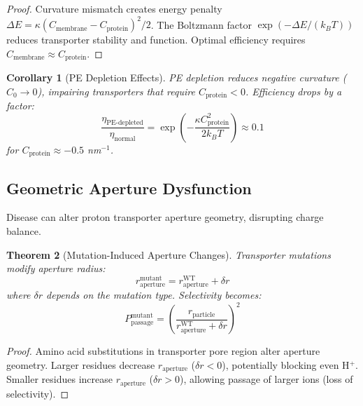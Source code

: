 \documentclass[11pt,twocolumn,a4paper]{article}
\newtheorem{theorem}{Theorem}[section]
\newtheorem{corollary}[theorem]{Corollary}
\theoremstyle{definition}
\theoremstyle{remark}
\begin{document}
\begin{proof}
Curvature mismatch creates energy penalty $\Delta E = \kappa(C_{\text{membrane}} - C_{\text{protein}})^2/2$. The Boltzmann factor $\exp(-\Delta E/(k_B T))$ reduces transporter stability and function. Optimal efficiency requires $C_{\text{membrane}} \approx C_{\text{protein}}$.
\end{proof}

\begin{corollary}[PE Depletion Effects]
\label{cor:pe_depletion}
PE depletion reduces negative curvature ($C_0 \to 0$), impairing transporters that require $C_{\text{protein}} < 0$. Efficiency drops by a factor:
\begin{equation}
\frac{\eta_{\text{PE-depleted}}}{\eta_{\text{normal}}} = \exp\left(-\frac{\kappa C_{\text{protein}}^2}{2k_B T}\right) \approx 0.1
\end{equation}
for $C_{\text{protein}} \approx -0.5$ nm$^{-1}$.
\end{corollary}

\subsection{Geometric Aperture Dysfunction}

Disease can alter proton transporter aperture geometry, disrupting charge balance.

\begin{theorem}[Mutation-Induced Aperture Changes]
\label{thm:mutation_aperture}
Transporter mutations modify aperture radius:
\begin{equation}
r_{\text{aperture}}^{\text{mutant}} = r_{\text{aperture}}^{\text{WT}} + \delta r
\end{equation}
where $\delta r$ depends on the mutation type. Selectivity becomes:
\begin{equation}
P_{\text{passage}}^{\text{mutant}} = \left(\frac{r_{\text{particle}}}{r_{\text{aperture}}^{\text{WT}} + \delta r}\right)^2
\end{equation}
\end{theorem}

\begin{proof}
Amino acid substitutions in transporter pore region alter aperture geometry. Larger residues decrease $r_{\text{aperture}}$ ($\delta r < 0$), potentially blocking even H$^+$. Smaller residues increase $r_{\text{aperture}}$ ($\delta r > 0$), allowing passage of larger ions (loss of selectivity).
\end{proof}
\end{document}
